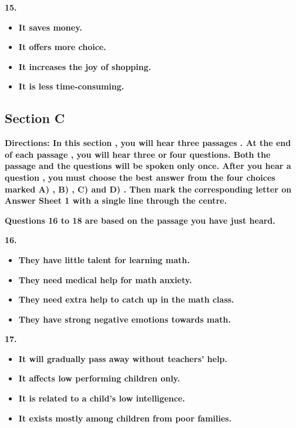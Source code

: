 \documentclass[UTF8,11pt]{ctexart}
\begin{document}
\textbf{15.}


\begin{itemize}[leftmargin=2em,itemsep=.2em,topsep=.4em]\item[A.] \textbf{It saves money.}
\item[B.] \textbf{It offers more choice.}
\item[C.] \textbf{It increases the joy of shopping.}
\item[D.] \textbf{It is less time-consuming.}
\end{itemize}

\subsection*{\textbf{Section }C}


\textbf{Directions: In this section , you will hear three passages . At the end of each passage , you will hear three or} \textbf{four questions. Both the passage and the questions will be spoken only once. After you hear a question , you} \textbf{must choose the best answer from the four choices marked A) , B) , C) and D) . Then mark the} \textbf{corresponding letter on Answer Sheet 1 with a single line through the centre.}


\textbf{Questions 16 to 18 are based on the passage you have just heard.}


\textbf{16.}


\begin{itemize}[leftmargin=2em,itemsep=.2em,topsep=.4em]\item[A.] \textbf{They have little talent for learning math.}
\item[B.] \textbf{They need medical help for math anxiety.}
\item[C.] \textbf{They need extra help to catch up in the math class.}
\item[D.] \textbf{They have strong negative emotions towards math.}
\end{itemize}

\textbf{17.}


\begin{itemize}[leftmargin=2em,itemsep=.2em,topsep=.4em]\item[A.] \textbf{It will gradually pass away without teachers' help.}
\item[B.] \textbf{It affects low performing children only.}
\item[C.] \textbf{It is related to a child's low intelligence.}
\item[D.] \textbf{It exists mostly among children from poor families.}
\end{itemize}
\end{document}
